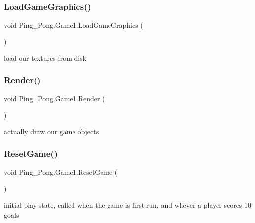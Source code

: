 \subsubsection{\texorpdfstring{Load\+Game\+Graphics()}{LoadGameGraphics()}}
{\footnotesize\ttfamily void Ping\+\_\+\+Pong.\+Game1.\+Load\+Game\+Graphics (\begin{DoxyParamCaption}{ }\end{DoxyParamCaption})\hspace{0.3cm}{\ttfamily [protected]}}



load our textures from disk 

\mbox{\label{class_ping___pong_1_1_game1_ad22887afd5e5fe23c2d5d218556046ee}} 
\subsubsection{\texorpdfstring{Render()}{Render()}}
{\footnotesize\ttfamily void Ping\+\_\+\+Pong.\+Game1.\+Render (\begin{DoxyParamCaption}{ }\end{DoxyParamCaption})}



actually draw our game objects 

\mbox{\label{class_ping___pong_1_1_game1_a30e3122abc5d6d6555b394ef9dfea097}} 
\subsubsection{\texorpdfstring{Reset\+Game()}{ResetGame()}}
{\footnotesize\ttfamily void Ping\+\_\+\+Pong.\+Game1.\+Reset\+Game (\begin{DoxyParamCaption}{ }\end{DoxyParamCaption})}



initial play state, called when the game is first run, and whever a player scores 10 goals 

\mbox{\label{class_ping___pong_1_1_game1_a558bcf5c17e9f410d5cceb2f66e2dd67}} 

